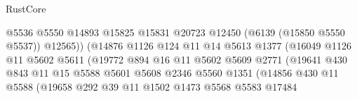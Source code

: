 \begin{lexlean}{RustCore}
\begin{coremodule}
                                          @5536
                                          @5550
                                          @14893
                                          @15825
                                          @15831
                                          @20723
                                          @12450
                                          (@6139 (@15850 @5550 @5537))
                                          @12565))
                                      (@14876
                                        @1126
                                        @124
                                        @11
                                        @14
                                        @5613
                                        @1377
                                        (@16049
                                          @1126
                                          @11
                                          @5602
                                          @5611
                                          (@19772
                                            @894
                                            @16
                                            @11
                                            @5602
                                            @5609
                                            @2771
                                            (@19641
                                              @430
                                              @843
                                              @11
                                              @15
                                              @5588
                                              @5601
                                              @5608
                                              @2346
                                              @5560
                                              @1351
                                              (@14856
                                                @430
                                                @11
                                                @5588
                                                (@19658
                                                  @292
                                                  @39
                                                  @11
                                                  @1502
                                                  @1473
                                                  @5568
                                                  @5583
                                                  @17484

\end{coremodule}
\end{lexlean}

